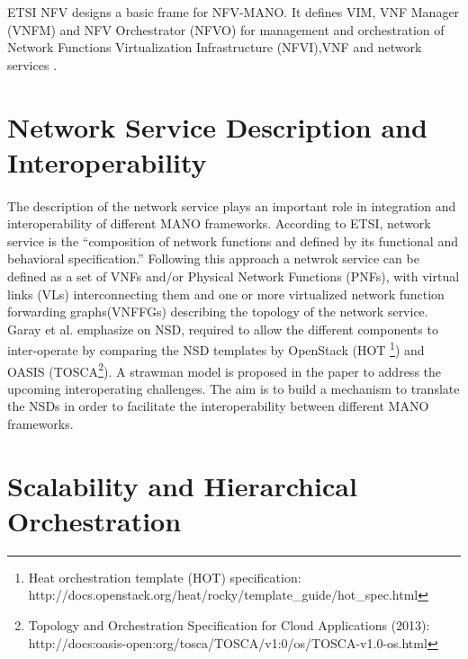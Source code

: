 ETSI NFV designs a basic frame for NFV-MANO. It defines VIM, VNF Manager (VNFM) and NFV Orchestrator (NFVO) for management and orchestration of Network Functions Virtualization Infrastructure (NFVI),VNF and network services \cite{etsi2014gs}.


\section{Network Service Description and Interoperability}
\label{serviceDescription}
\paragraph{}
The description of the network service plays an important role in integration and interoperability of different MANO frameworks. According to ETSI, network service is the “composition of network functions and defined by its functional and behavioral specification.” Following this approach a netwrok service can be defined as a set of VNFs and/or Physical Network Functions (PNFs), with virtual links (VLs) interconnecting them and one or more virtualized network function forwarding graphs(VNFFGs) describing the topology of the network service.\\

Garay et al. \cite{garay_service_2016} emphasize on NSD, required to allow the different components to inter-operate by comparing the NSD templates by OpenStack (HOT \footnote{Heat orchestration template (HOT) specification:        \\http://docs.openstack.org/heat/rocky/template\_guide/hot\_spec.html}) and OASIS (TOSCA\footnote{Topology and Orchestration Specification for Cloud Applications (2013):\\ http://docs:oasis-open:org/tosca/TOSCA/v1:0/os/TOSCA-v1.0-os.html}). A strawman model is proposed in the paper to address the upcoming interoperating challenges. The aim is to build a mechanism to translate the NSDs in order to facilitate the interoperability between different MANO frameworks.




\section{Scalability and Hierarchical Orchestration}
\label{manoscale}

